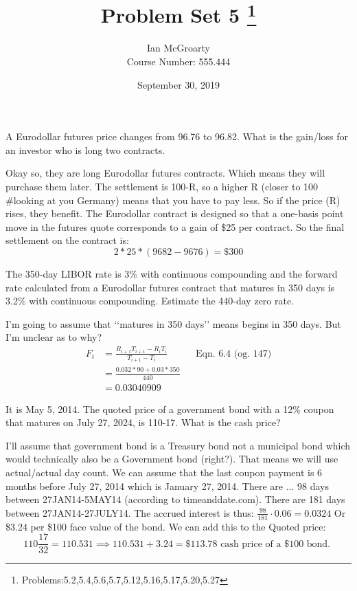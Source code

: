 \documentclass[12pt]{article}
\title{Problem Set 5 \thanks{Problems:5.2,5.4,5.6,5.7,5.12,5.16,5.17,5.20,5.27}}
\author{Ian McGroarty \\
	Course Number: 555.444}
\date{September 30, 2019}
\newenvironment{problem}[3][Problem]{\begin{trivlist}
\item[\hskip \labelsep {\bfseries #1}\hskip \labelsep {\bfseries #2.}]}{\end{trivlist}}
\begin{document}
\maketitle
\newpage
\begin{problem}{6.4}. A Eurodollar futures price changes from 96.76 to 96.82. What is the gain/loss for an investor who is long two contracts. 

Okay so, they are long Eurodollar futures contracts. Which means they will purchase them later. The settlement is 100-R, so a higher R (closer to 100 \#looking at you Germany)  means that you have to pay less.  So if the price (R) rises, they benefit. The Eurodollar contract is designed so that a one-basis point move in the futures quote corresponds to a gain of \$25 per contract. So the final settlement on the contract is: $$ 2 * 25*(9682-9676) = \$300 $$
\end{problem}

\begin{problem}{6.6}. The 350-day LIBOR rate is 3\% with continuous compounding and the forward rate calculated from a Eurodollar futures contract that matures in 350 days is 3.2\% with continuous compounding. Estimate the 440-day zero rate. 

I\rq{}m going to assume that \lq\lq{}matures in 350 days\rq\rq{} means begins in 350 days. But I\rq{}m unclear as to why? 
\begin{align*}
F_i &= \frac{R_{i+1}T_{i+1}-R_iT_i}{T_{i+1}-T_i} && \text{Eqn. 6.4 (og. 147)}\\
&= \frac{0.032*90 + 0.03*350}{440} \\
&= 0.03040909
\end{align*}
\end{problem}

\begin{problem}{6.9}. It is May 5, 2014. The quoted price of a government bond with a 12\% coupon that matures on July 27, 2024, is 110-17. What is the cash price? 

I\rq{}ll assume that government bond is a Treasury bond not a municipal bond which would technically also be a Government bond (right?). That means we will use actual/actual day count. We can assume that the last coupon payment is 6 months before July 27, 2014 which is January 27, 2014. There are ... 98 days between 27JAN14-5MAY14 (according to timeanddate.com). There are 181 days between 27JAN14-27JULY14. The accrued interest is thus: $\frac{98}{181} \cdot 0.06 =   0.0324$ Or \$3.24 per \$100 face value of the bond. We can add this to the Quoted price: 
$$110 \frac{17}{32} = 110.531 \implies 110.531 + 3.24 = \$113.78  \text{ cash price of a \$100 bond. }$$
\end{problem}
\end{document}
